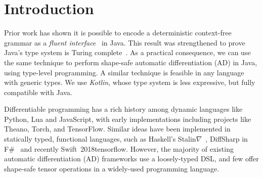 \documentclass{article}
\begin{document}


    \printAffiliationsAndNotice{}  %

    \section{Introduction}
    \label{submission}

    Prior work has shown it is possible to encode a deterministic context-free grammar as a \textit{fluent interface}~\cite{gil2016formal} in Java. This result was strengthened to prove Java's type system is Turing complete~\cite{grigore2017java}. As a practical consequence, we can use the same technique to perform shape-safe automatic differentiation (AD) in Java, using type-level programming. A similar technique is feasible in any language with generic types. We use \textit{Kotlin}, whose type system is less expressive, but fully compatible with Java.

    Differentiable programming has a rich history among dynamic languages like Python, Lua and JavaScript, with early implementations including projects like Theano, Torch, and TensorFlow. Similar ideas have been implemented in statically typed, functional languages, such as Haskell's Stalin$\nabla$~\cite{pearlmutter2008using}, DiffSharp in F\#~\cite{baydin2015diffsharp} and recently Swift~\citelattner2018tensorflow. However, the majority of existing automatic differentiation (AD) frameworks use a loosely-typed DSL, and few offer shape-safe tensor operations in a widely-used programming language.
\end{document}
